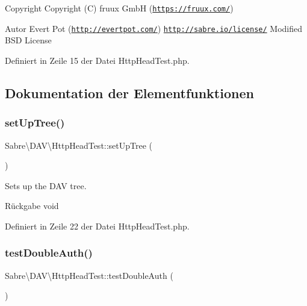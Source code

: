 \begin{DoxyCopyright}{Copyright}
Copyright (C) fruux GmbH (\href{https://fruux.com/}{\tt https\+://fruux.\+com/}) 
\end{DoxyCopyright}
\begin{DoxyAuthor}{Autor}
Evert Pot (\href{http://evertpot.com/}{\tt http\+://evertpot.\+com/})  \href{http://sabre.io/license/}{\tt http\+://sabre.\+io/license/} Modified B\+SD License 
\end{DoxyAuthor}


Definiert in Zeile 15 der Datei Http\+Head\+Test.\+php.



\subsection{Dokumentation der Elementfunktionen}
\mbox{\label{class_sabre_1_1_d_a_v_1_1_http_head_test_a537740a7921e43651c448975d377b9d6}} 
\subsubsection{\texorpdfstring{set\+Up\+Tree()}{setUpTree()}}
{\footnotesize\ttfamily Sabre\textbackslash{}\+D\+A\+V\textbackslash{}\+Http\+Head\+Test\+::set\+Up\+Tree (\begin{DoxyParamCaption}{ }\end{DoxyParamCaption})}

Sets up the D\+AV tree.

\begin{DoxyReturn}{Rückgabe}
void 
\end{DoxyReturn}


Definiert in Zeile 22 der Datei Http\+Head\+Test.\+php.

\mbox{\label{class_sabre_1_1_d_a_v_1_1_http_head_test_a4fe590e6508f28f58ac55e599e4f4468}} 
\subsubsection{\texorpdfstring{test\+Double\+Auth()}{testDoubleAuth()}}
{\footnotesize\ttfamily Sabre\textbackslash{}\+D\+A\+V\textbackslash{}\+Http\+Head\+Test\+::test\+Double\+Auth (\begin{DoxyParamCaption}{ }\end{DoxyParamCaption})}

